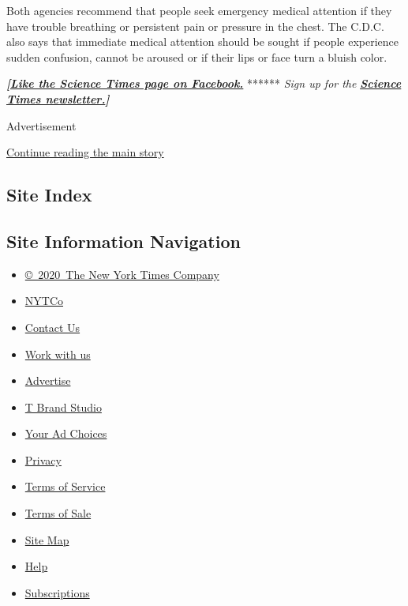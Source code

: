 Both agencies recommend that people seek emergency medical attention if
they have trouble breathing or persistent pain or pressure in the chest.
The C.D.C. also says that immediate medical attention should be sought
if people experience sudden confusion, cannot be aroused or if their
lips or face turn a bluish color.

\textbf{\emph{{[}}\href{http://on.fb.me/1paTQ1h}{\emph{Like the Science
Times page on Facebook.}}} ****** \emph{\textbar{} Sign up for the}
\textbf{\href{http://nyti.ms/1MbHaRU}{\emph{Science Times
newsletter.}}\emph{{]}}}

Advertisement

\protect\hyperlink{after-bottom}{Continue reading the main story}

\hypertarget{site-index}{%
\subsection{Site Index}\label{site-index}}

\hypertarget{site-information-navigation}{%
\subsection{Site Information
Navigation}\label{site-information-navigation}}

\begin{itemize}
\tightlist
\item
  \href{https://help.nytimes3xbfgragh.onion/hc/en-us/articles/115014792127-Copyright-notice}{©~2020~The
  New York Times Company}
\end{itemize}

\begin{itemize}
\tightlist
\item
  \href{https://www.nytco.com/}{NYTCo}
\item
  \href{https://help.nytimes3xbfgragh.onion/hc/en-us/articles/115015385887-Contact-Us}{Contact
  Us}
\item
  \href{https://www.nytco.com/careers/}{Work with us}
\item
  \href{https://nytmediakit.com/}{Advertise}
\item
  \href{http://www.tbrandstudio.com/}{T Brand Studio}
\item
  \href{https://www.nytimes3xbfgragh.onion/privacy/cookie-policy\#how-do-i-manage-trackers}{Your
  Ad Choices}
\item
  \href{https://www.nytimes3xbfgragh.onion/privacy}{Privacy}
\item
  \href{https://help.nytimes3xbfgragh.onion/hc/en-us/articles/115014893428-Terms-of-service}{Terms
  of Service}
\item
  \href{https://help.nytimes3xbfgragh.onion/hc/en-us/articles/115014893968-Terms-of-sale}{Terms
  of Sale}
\item
  \href{https://spiderbites.nytimes3xbfgragh.onion}{Site Map}
\item
  \href{https://help.nytimes3xbfgragh.onion/hc/en-us}{Help}
\item
  \href{https://www.nytimes3xbfgragh.onion/subscription?campaignId=37WXW}{Subscriptions}
\end{itemize}
